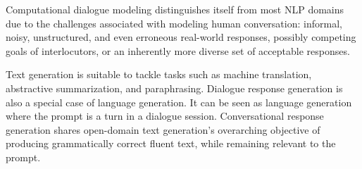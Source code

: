 Computational dialogue modeling distinguishes itself from most NLP domains due to the challenges associated with modeling human conversation: informal, noisy, unstructured, and even erroneous real-world responses, possibly competing goals of interlocutors, or an inherently more diverse set of acceptable responses.


Text generation is suitable to tackle tasks such as machine translation, abstractive summarization, and paraphrasing. Dialogue response generation is also a special case of language generation. It can be seen as language generation where the prompt is a turn in a dialogue session. Conversational response generation shares open-domain text generation's overarching objective of producing grammatically correct fluent text, while remaining relevant to the prompt. 



